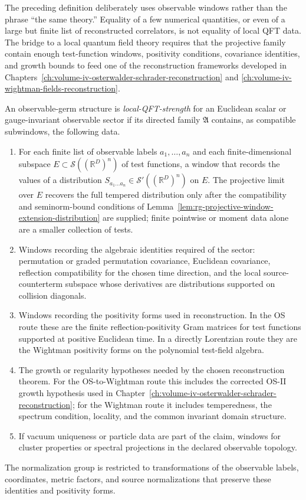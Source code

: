 The preceding definition deliberately uses observable windows rather than
the phrase ``the same theory.''  Equality of a few numerical quantities, or
even of a large but finite list of reconstructed correlators, is not equality
of local QFT data.  The bridge to a local quantum field theory requires that
the projective family contain enough test-function windows, positivity
conditions, covariance identities, and growth bounds to feed one of the
reconstruction frameworks developed in
Chapters~\ref{ch:volume-iv-osterwalder-schrader-reconstruction} and
\ref{ch:volume-iv-wightman-fields-reconstruction}.

\begin{definition}
\label{def:local-qft-strength-observable-germ}
An observable-germ structure is \emph{local-QFT-strength} for an
Euclidean scalar or gauge-invariant observable sector if its directed family
\(\mathfrak A\) contains, as compatible subwindows, the following data.
\begin{enumerate}
  \item For each finite list of observable labels
  \(a_1,\ldots,a_n\) and each finite-dimensional subspace
  \(E\subset\mathcal S((\mathbb R^D)^n)\) of test functions, a window that
  records the values of a distribution
  \(S_{a_1\ldots a_n}\in\mathcal S'((\mathbb R^D)^n)\) on \(E\).  The
  projective limit over \(E\) recovers the full tempered distribution only
  after the compatibility and seminorm-bound conditions of
  Lemma~\ref{lem:rg-projective-window-extension-distribution} are supplied;
  finite pointwise or moment data alone are a smaller collection of tests.
  \item Windows recording the algebraic identities required of the sector:
  permutation or graded permutation covariance, Euclidean covariance,
  reflection compatibility for the chosen time direction, and the local
  source-counterterm subspace whose derivatives are distributions supported
  on collision diagonals.
  \item Windows recording the positivity forms used in reconstruction.  In
  the OS route these are the finite reflection-positivity Gram matrices for
  test functions supported at positive Euclidean time.  In a directly
  Lorentzian route they are the Wightman positivity forms on the polynomial
  test-field algebra.
  \item The growth or regularity hypotheses needed by the chosen
  reconstruction theorem.  For the OS-to-Wightman route this includes the
  corrected OS-II growth hypothesis used in
  Chapter~\ref{ch:volume-iv-osterwalder-schrader-reconstruction}; for the
  Wightman route it includes temperedness, the spectrum condition, locality,
  and the common invariant domain structure.
  \item If vacuum uniqueness or particle data are part of the claim, windows
  for cluster properties or spectral projections in the declared observable
  topology.
\end{enumerate}
The normalization group is restricted to transformations of the observable
labels, coordinates, metric factors, and source normalizations that preserve
these identities and positivity forms.
\end{definition}

